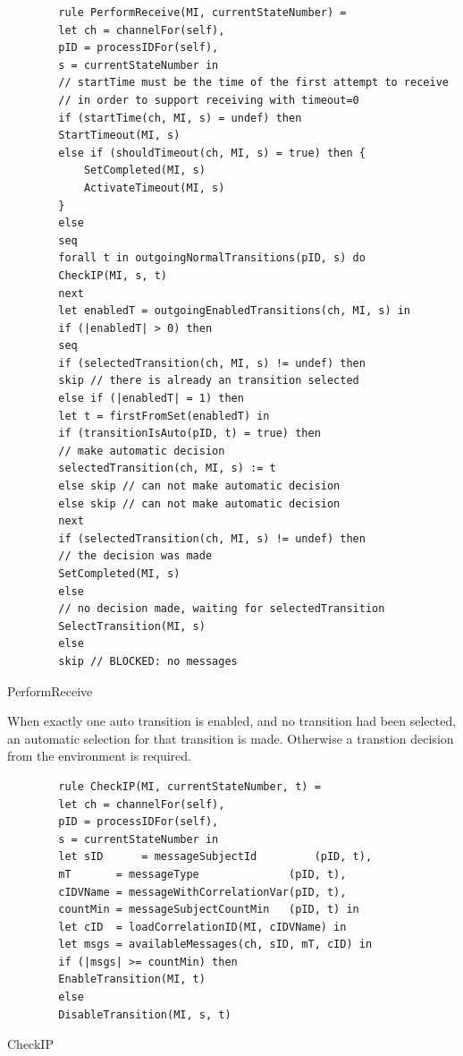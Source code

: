 \begin{listing}[H]
	\begin{verbatim}
		rule PerformReceive(MI, currentStateNumber) =
		let ch = channelFor(self),
		pID = processIDFor(self),
		s = currentStateNumber in
		// startTime must be the time of the first attempt to receive
		// in order to support receiving with timeout=0
		if (startTime(ch, MI, s) = undef) then
		StartTimeout(MI, s)
		else if (shouldTimeout(ch, MI, s) = true) then {
			SetCompleted(MI, s)
			ActivateTimeout(MI, s)
		}
		else
		seq
		forall t in outgoingNormalTransitions(pID, s) do
		CheckIP(MI, s, t)
		next
		let enabledT = outgoingEnabledTransitions(ch, MI, s) in
		if (|enabledT| > 0) then
		seq
		if (selectedTransition(ch, MI, s) != undef) then
		skip // there is already an transition selected
		else if (|enabledT| = 1) then
		let t = firstFromSet(enabledT) in
		if (transitionIsAuto(pID, t) = true) then
		// make automatic decision
		selectedTransition(ch, MI, s) := t
		else skip // can not make automatic decision
		else skip // can not make automatic decision
		next
		if (selectedTransition(ch, MI, s) != undef) then
		// the decision was made
		SetCompleted(MI, s)
		else
		// no decision made, waiting for selectedTransition
		SelectTransition(MI, s)
		else
		skip // BLOCKED: no messages
	\end{verbatim}
	\caption{PerformReceive}
	\label{lst:shortasm:PerformReceive}
\end{listing}




When exactly one auto transition is enabled, and no transition had been selected, an
automatic selection for that transition is made. Otherwise a transtion decision from
the environment is required.




\begin{listing}[H]
	\begin{verbatim}
		rule CheckIP(MI, currentStateNumber, t) =
		let ch = channelFor(self),
		pID = processIDFor(self),
		s = currentStateNumber in
		let sID      = messageSubjectId         (pID, t),
		mT       = messageType              (pID, t),
		cIDVName = messageWithCorrelationVar(pID, t),
		countMin = messageSubjectCountMin   (pID, t) in
		let cID  = loadCorrelationID(MI, cIDVName) in
		let msgs = availableMessages(ch, sID, mT, cID) in
		if (|msgs| >= countMin) then
		EnableTransition(MI, t)
		else
		DisableTransition(MI, s, t)
	\end{verbatim}
	\caption{CheckIP}
	\label{lst:shortasm:CheckIP}
\end{listing}


